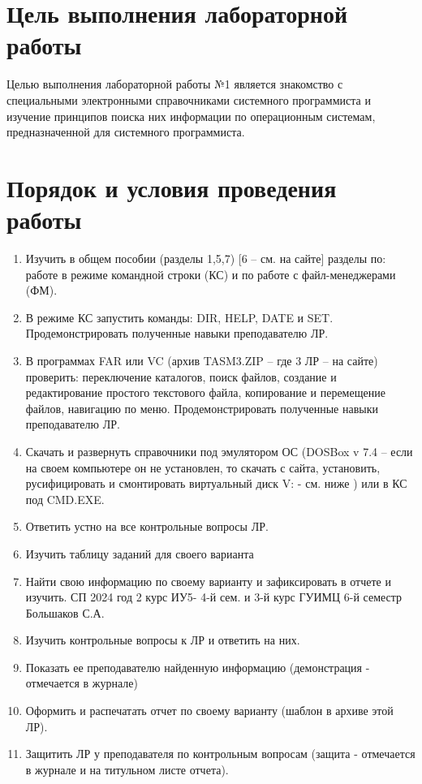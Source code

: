 \section{Цель выполнения лабораторной работы}
Целью выполнения лабораторной работы №1 является знакомство с специальными
электронными справочниками системного программиста и изучение принципов поиска
них информации по операционным системам, предназначенной для системного программиста.

\section{Порядок и условия проведения работы}
\begin{enumerate}
  \item Изучить в общем пособии (разделы 1,5,7) [6 – см. на сайте] разделы по: работе в режиме
        командной строки (КС) и по работе с файл-менеджерами (ФМ).
  \item В режиме КС запустить команды: DIR, HELP, DATE и SET. Продемонстрировать полученные
        навыки преподавателю ЛР.
  \item В программах FAR или VC (архив TASM3.ZIP – где 3 ЛР – на сайте) проверить: переключение
        каталогов, поиск файлов, создание и редактирование простого текстового файла, копирование
        и перемещение файлов, навигацию по меню. Продемонстрировать полученные навыки преподавателю ЛР.
  \item Скачать и развернуть справочники под эмулятором ОС (DOSBox v 7.4 – если на своем компьютере
        он не установлен, то скачать с сайта, установить, русифицировать и смонтировать виртуальный диск V:
        - см. ниже ) или в КС под CMD.EXE.
  \item Ответить устно на все контрольные вопросы ЛР.
  \item Изучить таблицу заданий для своего варианта
  \item Найти свою информацию по своему варианту и зафиксировать в отчете и изучить.
        СП 2024 год 2 курс ИУ5- 4-й сем. и 3-й курс ГУИМЦ 6-й семестр Большаков С.А.
  \item Изучить контрольные вопросы к ЛР и ответить на них.
  \item Показать ее преподавателю найденную информацию (демонстрация - отмечается в журнале)
  \item Оформить и распечатать отчет по своему варианту (шаблон в архиве этой ЛР).
  \item Защитить ЛР у преподавателя по контрольным вопросам (защита - отмечается в журнале
        и на титульном листе отчета).
\end{enumerate}

